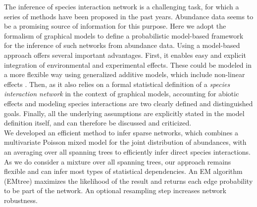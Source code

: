 The inference of species interaction network is a challenging task, for which a series of methods have been proposed in the past years. Abundance data seems to be a promising source of information for this purpose. Here we adopt the formalism of graphical models to define a probabilistic model-based framework for the inference of such networks from abundance data.
Using a model-based approach offers several important advantages. First, it enables easy and explicit integration of environmental and experimental effects.  These could be modeled in a more flexible way using generalized additive models, which include non-linear effects \citep{hastie2017generalized}. 
Then, as it also relies on a formal statistical definition of a \textsl{species interaction network} in the context of graphical models, accounting for abiotic effects and modeling species interactions are two clearly defined and distinguished goals. Finally, all the underlying assumptions are explicitly stated in the model definition itself, and can therefore be discussed and criticized. \\



We developed an efficient method to infer sparse networks, which combines a multivariate Poisson mixed model for the joint distribution of abundances, with an averaging over all spanning trees to efficiently infer direct species interactions. As we do consider a mixture over all spanning trees, our approach remains flexible and can infer most types of statistical dependencies. An EM algorithm (EMtree) maximizes the likelihood of the result and returns each edge probability to be part of the network. An optional resampling step increases network robustness.


\\

